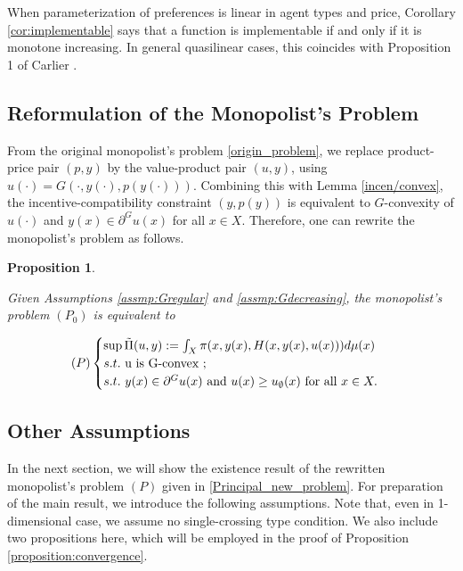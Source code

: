 \documentclass[a4paper, 11pt]{amsart}
\numberwithin{equation}{section}
\theoremstyle{plain}
\newtheorem{proposition}[theorem]{Proposition}
\theoremstyle{definition}
\theoremstyle{remark}
\begin{document}
When parameterization of preferences is linear in agent types and price, Corollary \ref{cor:implementable} says that a function is implementable if and only if it is monotone increasing. In general quasilinear cases, this coincides with Proposition 1 of Carlier \cite{Carlier01}. \medskip


\subsection{Reformulation of the Monopolist's Problem}\label{subsection:reformulation}
From the original monopolist's problem \eqref{origin_problem}, we replace product-price pair $(p,y)$ by the value-product pair $(u,y)$, using $u(\cdot) = G(\cdot, y(\cdot), p(y(\cdot)))$. %
Combining this with Lemma \ref{incen/convex}, the incentive-compatibility constraint $(y,p(y))$ is equivalent to $G$-convexity of $u(\cdot)$ and $y(x) \in \partial^G u(x)$ for all $x\in X$. Therefore, one can rewrite the monopolist's problem as follows.

\begin{proposition}\label{equiv_form}
	
	Given Assumptions \ref{assmp:Gregular} and \ref{assmp:Gdecreasing}, the monopolist's problem $(P_0)$ is equivalent to
	
	\begin{equation}\label{Principal_new_problem}
	(P)
	\begin{cases}
	\sup \tilde{\Pi}(u,y):=\int_{X} \pi(x, y(x), H(x,y(x), u(x))) d\mu(x)\\
	s.t.\ $u$ \text{ is } $G$\text{-convex };\\
	s.t.\ y(x) \in \partial^G u(x) \text{ and }u(x)\ge u_{\emptyset}(x) \text{ for all } x \in X.
	\end{cases}
	\end{equation}
\end{proposition}

\medskip


\subsection{Other Assumptions}\label{subsection:assumptions}
In the next section, we will show the existence result of the rewritten monopolist's problem $(P)$ given in \eqref{Principal_new_problem}. For preparation of the main result, we introduce the following assumptions. Note that, even in 1-dimensional case, we assume no single-crossing type condition. We also include two propositions here, which will be employed in the proof of Proposition \ref{proposition:convergence}. \medskip%
\end{document}
